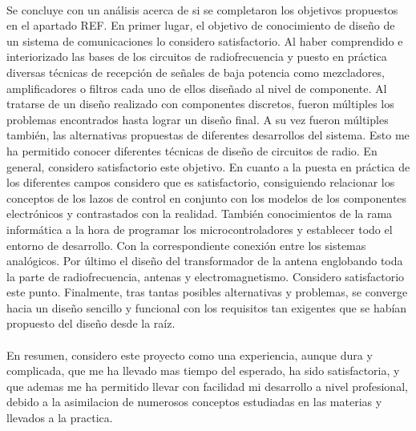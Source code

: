 \paragraph{}
Se concluye con un análisis acerca de si se completaron los objetivos propuestos en el apartado REF.
En primer lugar, el objetivo de conocimiento de diseño de un sistema de comunicaciones lo considero satisfactorio. Al haber comprendido e interiorizado las bases de los circuitos de radiofrecuencia y puesto en práctica diversas técnicas de recepción de señales de baja potencia como mezcladores, amplificadores o filtros cada uno de ellos diseñado al nivel de componente.
Al tratarse de un diseño realizado con componentes discretos, fueron múltiples los problemas encontrados hasta lograr un diseño final. A su vez fueron múltiples también, las alternativas propuestas de diferentes desarrollos del sistema. Esto me ha permitido conocer diferentes técnicas de diseño de circuitos de radio. En general, considero satisfactorio este objetivo.
En cuanto a la puesta en práctica de los diferentes campos considero que es satisfactorio, consiguiendo relacionar los conceptos de los lazos de control en conjunto con los modelos de los componentes electrónicos y contrastados con la realidad. 
También conocimientos de la rama informática a la hora de programar los microcontroladores y establecer todo el entorno de desarrollo. Con la correspondiente conexión entre los sistemas analógicos.
Por último el diseño del transformador de la antena englobando toda la parte de radiofrecuencia, antenas y electromagnetismo. Considero satisfactorio este punto.
Finalmente, tras tantas posibles alternativas y problemas, se converge hacia un diseño sencillo y funcional con los requisitos tan exigentes que se habían propuesto del diseño desde la raíz. 

\paragraph{}
En resumen, considero este proyecto como una experiencia, aunque dura y complicada, que me ha llevado mas tiempo del esperado, ha sido satisfactoria, y que ademas me ha permitido llevar con facilidad mi desarrollo a nivel profesional, debido a la asimilacion de numerosos conceptos estudiadas en las materias y llevados a la practica.
